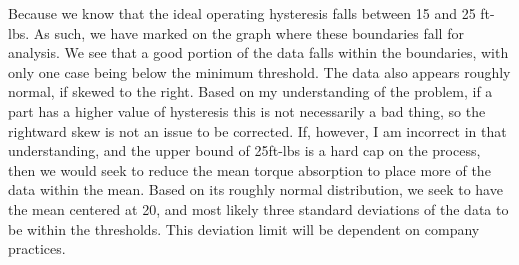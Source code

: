 \documentclass[letterpaper,10pt]{article}
\begin{document}
\begin{enumerate}
\begin{center}
\end{center}
Because we know that the ideal operating hysteresis falls between 15 and 25 ft-lbs. As such, we have marked on the graph where these boundaries fall for analysis. We see that a good portion of the data falls within the boundaries, with only one case being below the minimum threshold. The data also appears roughly normal, if skewed to the right. Based on my understanding of the problem, if a part has a higher value of hysteresis this is not necessarily a bad thing, so the rightward skew is not an issue to be corrected. If, however, I am incorrect in that understanding, and the upper bound of 25ft-lbs is a hard cap on the process, then we would seek to reduce the mean torque absorption to place more of the data within the mean. Based on its roughly normal distribution, we seek  to have the mean centered at 20, and most likely three standard deviations of the data to be within the thresholds. This deviation limit will be dependent on company practices.
\end{enumerate}
\end{document}
